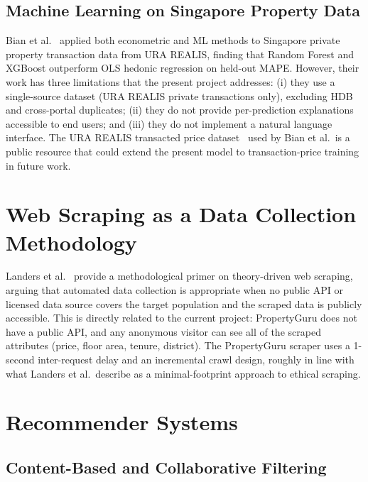 \subsection{Machine Learning on Singapore Property Data}

Bian et al.~\cite{bian2020comparing} applied both econometric and ML methods to Singapore
private property transaction data from URA REALIS, finding that Random Forest and XGBoost
outperform OLS hedonic regression on held-out MAPE. However, their work has three limitations
that the present project addresses: (i) they use a single-source dataset (URA REALIS private
transactions only), excluding HDB and cross-portal duplicates; (ii) they do not provide
per-prediction explanations accessible to end users; and (iii) they do not implement a
natural language interface. The URA REALIS transacted price dataset~\cite{ura2024realis} used
by Bian et al.\ is a public resource that could extend the present model to transaction-price
training in future work.

\section{Web Scraping as a Data Collection Methodology}

Landers et al.~\cite{landers2016inconvenient} provide a methodological primer on theory-driven
web scraping, arguing that automated data collection is appropriate when no public API or
licensed data source covers the target population and the scraped data is publicly accessible.
This is directly related to the current project: PropertyGuru does not have a public API, and any anonymous visitor can see all of the scraped attributes (price, floor area, tenure, district).
The PropertyGuru scraper uses a 1-second inter-request delay and an incremental crawl design,
roughly in line with what Landers et al.\ describe as a minimal-footprint approach to
ethical scraping.

\section{Recommender Systems}

\subsection{Content-Based and Collaborative Filtering}

